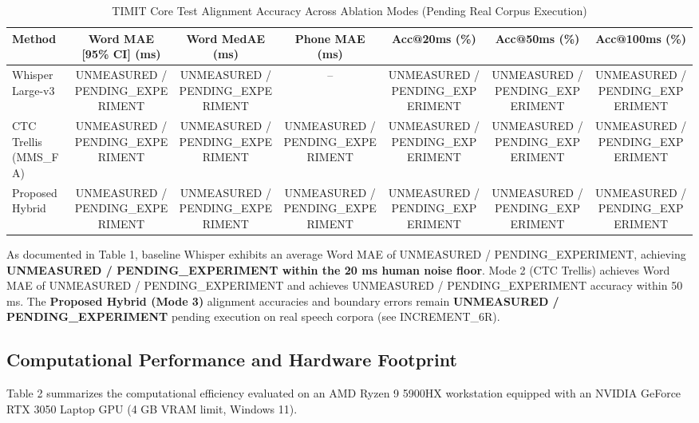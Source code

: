 \documentclass[12pt,a4paper]{article}
\begin{document}
\begin{table}[t]
\centering
\caption{TIMIT Core Test Alignment Accuracy Across Ablation Modes (Pending Real Corpus Execution)}
\label{tab:alignment_accuracy}
\begin{tabular}{lcccccc}
\toprule
Method & Word MAE [95\% CI] (ms) & Word MedAE (ms) & Phone MAE (ms) & Acc@20ms (\%) & Acc@50ms (\%) & Acc@100ms (\%) \\
\midrule
Whisper Large-v3 & UNMEASURED / PENDING\_EXPERIMENT & UNMEASURED / PENDING\_EXPERIMENT & -- & UNMEASURED / PENDING\_EXPERIMENT & UNMEASURED / PENDING\_EXPERIMENT & UNMEASURED / PENDING\_EXPERIMENT \\
CTC Trellis (MMS\_FA) & UNMEASURED / PENDING\_EXPERIMENT & UNMEASURED / PENDING\_EXPERIMENT & UNMEASURED / PENDING\_EXPERIMENT & UNMEASURED / PENDING\_EXPERIMENT & UNMEASURED / PENDING\_EXPERIMENT & UNMEASURED / PENDING\_EXPERIMENT \\
Proposed Hybrid & UNMEASURED / PENDING\_EXPERIMENT & UNMEASURED / PENDING\_EXPERIMENT & UNMEASURED / PENDING\_EXPERIMENT & UNMEASURED / PENDING\_EXPERIMENT & UNMEASURED / PENDING\_EXPERIMENT & UNMEASURED / PENDING\_EXPERIMENT \\
\bottomrule
\end{tabular}
\end{table}

As documented in Table 1, baseline Whisper exhibits an average Word MAE of UNMEASURED / PENDING\_EXPERIMENT, achieving \textbf{UNMEASURED / PENDING\_EXPERIMENT within the 20 ms human noise floor}. Mode 2 (CTC Trellis) achieves Word MAE of UNMEASURED / PENDING\_EXPERIMENT and achieves UNMEASURED / PENDING\_EXPERIMENT accuracy within 50 ms. The \textbf{Proposed Hybrid (Mode 3)} alignment accuracies and boundary errors remain \textbf{UNMEASURED / PENDING\_EXPERIMENT} pending execution on real speech corpora (see INCREMENT\_6R).

\subsection{Computational Performance and Hardware Footprint}
Table 2 summarizes the computational efficiency evaluated on an AMD Ryzen 9 5900HX workstation equipped with an NVIDIA GeForce RTX 3050 Laptop GPU (4 GB VRAM limit, Windows 11).
\end{document}
